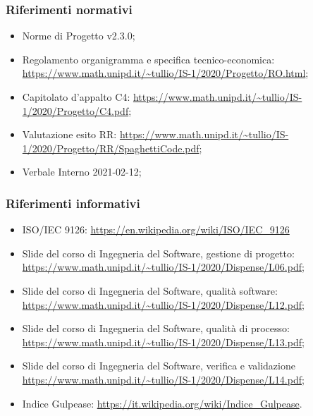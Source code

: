 \documentclass[../piano_di_qualifica.tex]{subfiles}
\begin{document}
\subsubsection{Riferimenti normativi}
\begin{itemize}
	\item Norme di Progetto v2.3.0;
	\item Regolamento organigramma e specifica tecnico-economica: \url{https://www.math.unipd.it/~tullio/IS-1/2020/Progetto/RO.html};
	\item Capitolato d’appalto C4: \url{https://www.math.unipd.it/~tullio/IS-1/2020/Progetto/C4.pdf};
	\item Valutazione esito RR: \url{https://www.math.unipd.it/~tullio/IS-1/2020/Progetto/RR/SpaghettiCode.pdf};
	\item Verbale Interno 2021-02-12;
\end{itemize}

\subsubsection{Riferimenti informativi}

\begin{itemize}
	\item ISO/IEC 9126: \url{https://en.wikipedia.org/wiki/ISO/IEC_9126}
	\item Slide del corso di Ingegneria del Software, gestione di progetto: \url{https://www.math.unipd.it/~tullio/IS-1/2020/Dispense/L06.pdf};
	\item Slide del corso di Ingegneria del Software, qualità software: \url{https://www.math.unipd.it/~tullio/IS-1/2020/Dispense/L12.pdf};
	\item Slide del corso di Ingegneria del Software, qualità di processo: \url{https://www.math.unipd.it/~tullio/IS-1/2020/Dispense/L13.pdf};
	\item Slide del corso di Ingegneria del Software, verifica e validazione \url{https://www.math.unipd.it/~tullio/IS-1/2020/Dispense/L14.pdf};
	\item Indice Gulpease: \url{https://it.wikipedia.org/wiki/Indice_Gulpease}.
\end{itemize}
\end{document}
